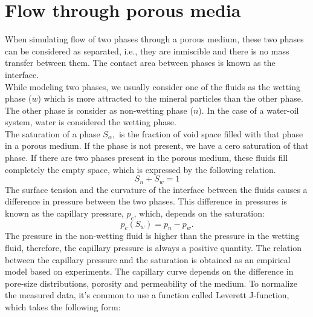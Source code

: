 \documentclass[12pt]{article}
\begin{document}
 \section{Flow through porous media}\label{fpm}
When simulating flow of two phases through a porous medium, these two phases can be considered as separated, i.e., they are inmiscible and there is no mass transfer between them. 
The contact area between phases is known as the interface.\\ 
While modeling two phases, we 
usually consider one of the fluids as the wetting phase ($w$) which is more attracted to the mineral particles than the other phase.
The other phase is consider as non-wetting phase ($n$). In the case of a water-oil system, water is considered
the wetting phase. \\
The saturation of a phase $S_{\alpha},$ is the fraction of void space filled with that phase in a porous 
medium. If the phase is not present, we have a cero saturation of that phase.
If there are two phases present in the porous medium, these fluids fill completely the empty space, which is
expressed by the following relation.
\begin{equation}\label{eq:satrel}
 S_n+S_w=1
\end{equation}
The surface tension and the curvature of the interface between the fluids causes a difference in pressure
between the two phases. 
This difference in pressures is known as the capillary pressure, $p_c$, which, depends on the saturation:
\begin{equation}\label{eq:cappress}
 p_c(S_w)=p_n-p_w.
\end{equation}
The pressure in the non-wetting fluid is higher than the pressure in the wetting fluid, 
therefore, the capillary pressure is always a positive quantity. 
The relation between the capillary pressure and the saturation is obtained as an empirical model based on experiments. 
The capillary curve depends on the difference in pore-size 
distributions, porosity and permeability of the medium.
To normalize the measured data, it's common to use a function called Leverett J-function, which takes the following 
form:
\end{document}
